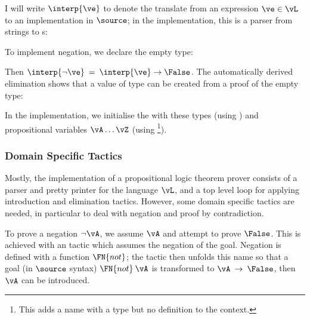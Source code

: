 \DM{
\AR{
\Data\:\Tor\:(\vA,\vB\Hab\Type)\Hab\Type\hg\Where\\
\hg\hg\ARd{
& \orintrol\Hab\fbind{\va}{\vA}{\Tor\:\vA\:\vB}\\
\mid & \orintror\Hab\fbind{\vb}{\vB}{\Tor\:\vA\:\vB}
}
}
}

I will write $\interp{\ve}$ to denote the translate from an expression
$\ve\in\vL$ to an implementation in $\source$; in the implementation,
this is a parser from strings to s:


To implement negation, we declare the empty type:

\DM{
\Data\:\False\Hab\Type\hg\Where
}

Then $\interp{\neg\ve}\:=\:\interp{\ve}\to\False$. The automatically
derived elimination shows that a value
of  type can be created from a proof of the empty type:

\DM{
\Elim{\False}\Hab\fbind{\vx}{\False}{
\fbind{\motive}{\False\to\Type}{\motive\:\vx}}
}

In the implementation, we initialise the  with these
types (using ) and propositional variables
$\vA\ldots\vZ$ (using \footnote{This adds a name with
  a type but no definition to the context.}).

\subsubsection{Domain Specific Tactics}
Mostly, the implementation of a propositional logic theorem prover
consists of a parser and pretty printer for the language $\vL$, and a
top level loop for applying introduction and elimination
tactics. However, some domain
specific tactics are needed, in particular to deal with negation and
proof by contradiction.

To prove a negation $\neg\vA$, we assume $\vA$ and attempt to prove
$\False$. This is achieved with an  tactic which
assumes the negation of the goal. Negation is defined with a function
$\FN{not}$; the  tactic then unfolds this name so
that a goal (in $\source$ syntax) $\FN{not}\:\vA$ is transformed to
$\vA\:\to\:\False$, then $\vA$ can be introduced.

